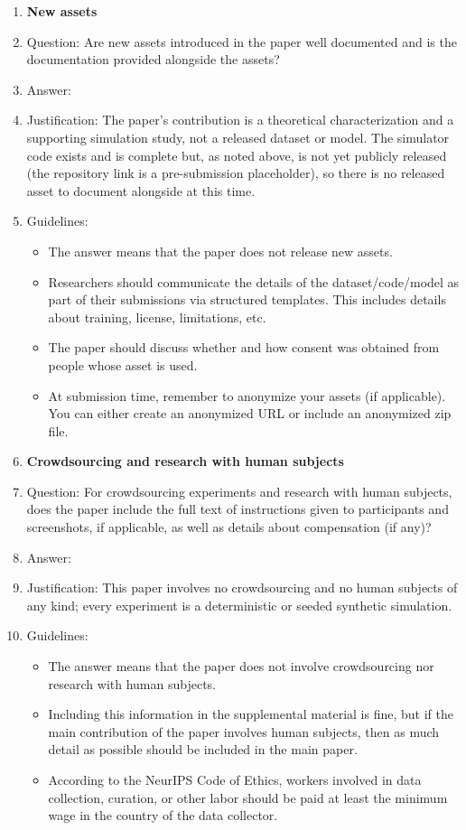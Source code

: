 \begin{enumerate}
\item {\bf New assets}
    \item[] Question: Are new assets introduced in the paper well documented and is the documentation provided alongside the assets?
    \item[] Answer: \answerNA{}
    \item[] Justification: The paper's contribution is a theoretical characterization and a supporting simulation study, not a released dataset or model. The simulator code exists and is complete but, as noted above, is not yet publicly released (the repository link is a pre-submission placeholder), so there is no released asset to document alongside at this time.
    \item[] Guidelines:
    \begin{itemize}
        \item The answer \answerNA{} means that the paper does not release new assets.
        \item Researchers should communicate the details of the dataset\slash code\slash model as part of their submissions via structured templates. This includes details about training, license, limitations, etc.
        \item The paper should discuss whether and how consent was obtained from people whose asset is used.
        \item At submission time, remember to anonymize your assets (if applicable). You can either create an anonymized URL or include an anonymized zip file.
    \end{itemize}

\item {\bf Crowdsourcing and research with human subjects}
    \item[] Question: For crowdsourcing experiments and research with human subjects, does the paper include the full text of instructions given to participants and screenshots, if applicable, as well as details about compensation (if any)?
    \item[] Answer: \answerNA{}
    \item[] Justification: This paper involves no crowdsourcing and no human subjects of any kind; every experiment is a deterministic or seeded synthetic simulation.
    \item[] Guidelines:
    \begin{itemize}
        \item The answer \answerNA{} means that the paper does not involve crowdsourcing nor research with human subjects.
        \item Including this information in the supplemental material is fine, but if the main contribution of the paper involves human subjects, then as much detail as possible should be included in the main paper.
        \item According to the NeurIPS Code of Ethics, workers involved in data collection, curation, or other labor should be paid at least the minimum wage in the country of the data collector.
    \end{itemize}


\end{enumerate}
